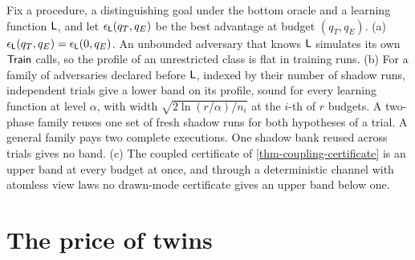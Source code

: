 \begin{proposition}
Fix a procedure, a distinguishing goal under the bottom oracle and a learning
function $\mathsf{L}$, and let $\epsilon_{\mathsf{L}}(q_T,q_E)$ be the best advantage at budget
$(q_T,q_E)$. (a) $\epsilon_{\mathsf{L}}(q_T,q_E)=\epsilon_{\mathsf{L}}(0,q_E)$. An unbounded adversary that
knows $\mathsf{L}$ simulates its own $\mathsf{Train}$ calls, so the profile of an unrestricted class
is flat in training runs. (b) For a family of adversaries declared before $\mathsf{L}$,
indexed by their number of shadow runs, independent trials give a lower band on its
profile, sound for every learning function at level $\alpha$, with width
$\sqrt{2\ln(r/\alpha)/n_i}$ at the $i$-th of $r$ budgets. A two-phase family reuses
one set of fresh shadow runs for both hypotheses of a trial. A general family pays
two complete executions. One shadow bank reused across trials gives no band. (c) The
coupled certificate of \cref{thm-coupling-certificate} is an upper band at every budget
at once, and through a deterministic channel with atomless view laws no drawn-mode
certificate gives an upper band below one.
\end{proposition}

\section{The price of twins}

